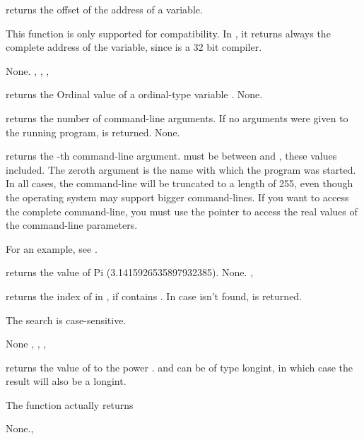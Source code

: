 \documentclass{report}
\begin{document}


{ returns the offset of the address of a variable. 

This function is only supported for compatibility. In \fpc, it 
returns always the complete address of the variable, since \fpc is a 32 bit 
compiler.
}
{None.}
{, , , }





{ returns the Ordinal value of a ordinal-type variable .}
{None.}
{}




{ returns the number of command-line arguments. If no
arguments were given to the running program,  is returned.
}
{None.}
{}




{ returns the -th command-line argument.  must
be between  and , these values included.
The zeroth argument is the name with which the program was started.
}
{ In all cases, the command-line will be truncated to a length of 255,
even though the operating system may support bigger command-lines. If you
want to access the complete command-line, you must use the  pointer
to access the real values of the command-line parameters.}
{}

For an example, see .

{ returns the value of Pi (3.1415926535897932385).}
{None.}
{, }




{ returns the index of  in , if  contains
. In case  isn't found,  is returned.

The search is case-sensitive.
}
{None}
{, , , }




{
 returns the value of  to the power . 
 and  can be of type longint, in which case the 
result will also be a longint.
 
The function actually returns 
}{None.}{, }
\end{document}
